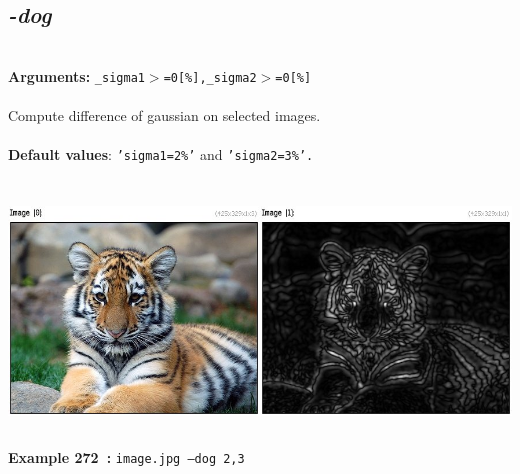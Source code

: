 \documentclass[a4paper,11pt,twoside]{book}
\begin{document}
\subsection{\emph{-dog} }\vspace*{-0.5em}
~\\\textbf{Arguments: } 
{\small \texttt{\_sigma1$>$=0[\%],\_sigma2$>$=0[\%]}}\\~\\
Compute difference of gaussian on selected images.
~\\~\\\textbf{Default values}: {\small \texttt{'sigma1=2\%'} and \texttt{'sigma2=3\%'.}}
\begin{center}\includegraphics[keepaspectratio=true,height=7cm,width=\textwidth]{img/gmic_def272.jpg}\\
{\footnotesize \textbf{Example 272~:} \texttt{image.jpg --dog 2,3}}
\end{center}
\end{document}
